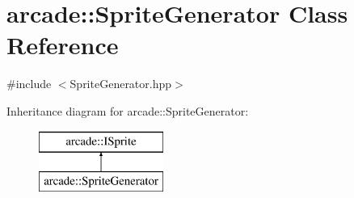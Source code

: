 \hypertarget{classarcade_1_1_sprite_generator}{\section{arcade\-:\-:Sprite\-Generator Class Reference}
\label{classarcade_1_1_sprite_generator}
}


{\ttfamily \#include $<$Sprite\-Generator.\-hpp$>$}

Inheritance diagram for arcade\-:\-:Sprite\-Generator\-:\begin{figure}[H]
\begin{center}
\leavevmode
\includegraphics[height=2.000000cm]{classarcade_1_1_sprite_generator}
\end{center}
\end{figure}
